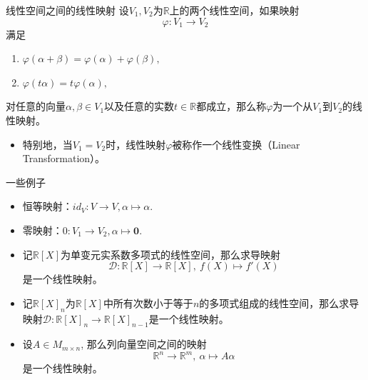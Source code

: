 \begin{frame}

\begin{block}{线性空间之间的线性映射}
设$V_1, V_2$为$\mathbb{R}$上的两个线性空间，如果映射
$$\varphi: V_1 \longrightarrow V_2$$
满足
\begin{enumerate}
\item $\varphi(\alpha + \beta) = \varphi(\alpha) + \varphi(\beta),$
\item $\varphi(t\alpha) = t\varphi(\alpha),$
\end{enumerate}
对任意的向量$\alpha,\beta\in V_1$以及任意的实数$t\in\mathbb{R}$都成立，那么称$\varphi$为一个从$V_1$到$V_2$的线性映射。

\vspace{2em}
\pause

\begin{itemize}
\item 特别地，当$V_1 = V_2$时，线性映射$\varphi$被称作一个线性变换（Linear Transformation）。
\end{itemize}
\end{block}

\end{frame}


\begin{frame}

\begin{block}{一些例子}
\begin{itemize}
\item 恒等映射：$id_V: V \to V, \alpha \mapsto \alpha$.
\item 零映射：$0: V_1 \to V_2, \alpha \mapsto \mathbf{0}$.
\pause
\item 记$\mathbb{R}[X]$为单变元实系数多项式的线性空间，那么求导映射
\[
\mathscr{D}: \mathbb{R}[X] \rightarrow \mathbb{R}[X], \  f(X) \mapsto f'(X)
\]
是一个线性映射。
\item 记$\mathbb{R}[X]_n$为$\mathbb{R}[X]$中所有次数小于等于$n$的多项式组成的线性空间，那么求导映射$\mathscr{D}: \mathbb{R}[X]_n \to \mathbb{R}[X]_{n-1}$是一个线性映射。
\pause
\item 设$A\in M_{m\times n}$, 那么列向量空间之间的映射
\[
\mathbb{R}^n \to \mathbb{R}^m, \ \alpha \mapsto A\alpha
\]
是一个线性映射。
\end{itemize}
\end{block}

\end{frame}

